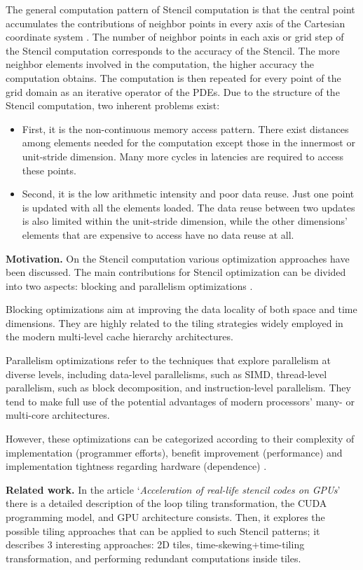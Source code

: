\documentclass[conference]{IEEEtran}
\newcommand{\mypar}[1]{{\bf #1.}}
\begin{document}
The general computation pattern of Stencil computation is that the central point accumulates the contributions of neighbor points in every axis of the Cartesian coordinate system \cite{su-zhang-mei}. The number of neighbor points in each axis or grid step of the Stencil computation corresponds to the accuracy of the Stencil. The more neighbor elements involved in the computation, the higher accuracy the computation obtains. The computation is then repeated for every point of the grid domain as an iterative operator of the PDEs. Due to the structure of the Stencil computation, two inherent problems exist:
\begin{itemize}
	\item First, it is the non-continuous memory access pattern. There exist distances among elements needed for the computation except those in the innermost or unit-stride dimension. Many more cycles in latencies are required to access these points. 
	\item Second, it is the low arithmetic intensity and poor data reuse. Just one point is updated with all the elements loaded. The data reuse between two updates is also limited within the unit-stride dimension, while the other dimensions' elements that are expensive to access have no data reuse at all.
\end{itemize}


\mypar{Motivation} 
On the Stencil computation various optimization approaches have been discussed. The main contributions for Stencil optimization can be divided into two aspects: blocking and parallelism optimizations \cite{su-zhang-mei}.

Blocking optimizations aim at improving the data locality of both space and time dimensions. They are highly related to the tiling strategies widely employed in the modern multi-level cache hierarchy architectures.
 
Parallelism optimizations refer to the techniques that explore parallelism at diverse levels, including data-level parallelisms, such as SIMD, thread-level parallelism, such as block decomposition, and instruction-level parallelism. They tend to make full use of the potential advantages of modern processors' many- or multi-core architectures. 

However, these optimizations can be categorized according to their complexity of implementation (programmer efforts), benefit improvement (performance) and implementation tightness regarding hardware (dependence) \cite{cruz}.

\mypar{Related work} 
In the article `\textit{Acceleration of real-life stencil codes on GPUs}' \cite{barigou} there is a detailed description of the loop tiling transformation, the CUDA programming model, and GPU architecture consists. Then, it explores the possible tiling approaches that can be applied to such Stencil patterns; it describes 3 interesting approaches: 2D tiles, time-skewing+time-tiling transformation, and performing redundant computations inside tiles.
\end{document}
